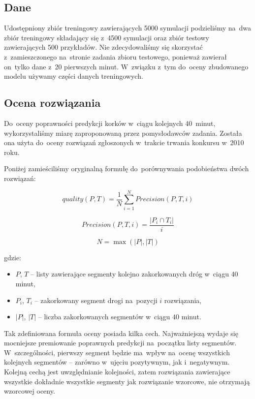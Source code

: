 \documentclass[a4paper,12pt]{mwart}
\begin{document}
\subsection{Dane}

Udostępniony zbiór treningowy zawierających 5000 symulacji podzieliśmy na~dwa zbiór treningowy składający się z~4500 symulacji oraz zbiór testowy zawierających 500 przykładów. Nie zdecydowaliśmy się skorzystać z~zamieszczonego na~stronie zadania zbioru testowego, ponieważ zawierał on~tylko dane z~20 pierwszych minut. W~związku z~tym do~oceny zbudowanego modelu używamy części danych treningowych.

\subsection{Ocena rozwiązania}

Do~oceny poprawności predykcji korków w~ciągu kolejnych 40~minut, wykorzystaliśmy miarę zaproponowaną przez pomysłodawców zadania. Została ona użyta do~oceny rozwiązań zgłoszonych w~trakcie trwania konkursu w~2010 roku.

Poniżej zamieściliśmy oryginalną formułę do~porównywania podobieństwa dwóch rozwiązań:

\[quality(P, T) = \frac{1}{N}\sum_{i = 1}^N Precision(P, T, i)\]

\[Precision(P, T, i) = \frac{\left | P_i \cap T_i \right |}{i}\]

\[N = \max (\left | P \right |, \left | T \right |)\]

gdzie:

\begin{itemize}
\item $P$, $T$ -- listy zawierające segmenty kolejno zakorkowanych dróg w~ciągu 40 minut,
\item $P_i$, $T_i$ -- zakorkowany segment drogi na~pozycji $i$ rozwiązania,
\item $\left | P \right |$, $\left | T \right |$ -- liczba zakorkowanych segmentów w~ciągu 40 minut.
\end{itemize}

Tak zdefiniowana formuła oceny posiada kilka cech. Najważniejszą wydaje się mocniejsze premiowanie poprawnych predykcji na~początku listy segmentów. W~szczególności, pierwszy segment będzie ma~wpływ na~ocenę wszystkich kolejnych segmentów -- zarówno w~ujęciu pozytywnym, jak i~negatywnym. Kolejną cechą jest uwzględnianie kolejności, zatem rozwiązania zawierające wszystkie dokładnie wszystkie segmenty jak rozwiązanie wzorcowe, nie otrzymają wzorcowej oceny.
\end{document}

